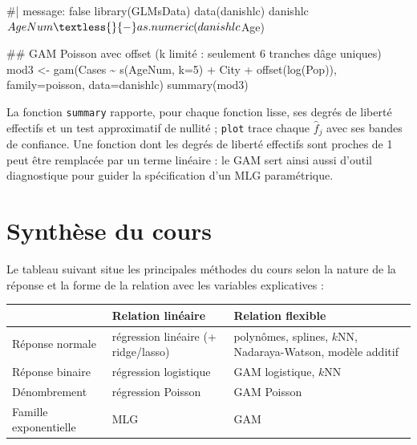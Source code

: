 \documentclass[
  french,
  letterpaper,
  DIV=11,
  numbers=noendperiod]{scrreprt}
\newenvironment{Shaded}{\begin{snugshade}}{\end{snugshade}}
\newcommand{\NormalTok}[1]{\textcolor[rgb]{0.00,0.23,0.31}{#1}}
\newcounter{none} %
\begin{document}
\begin{Shaded}
\begin{Highlighting}[]
\NormalTok{\#| message: false}
\NormalTok{library(GLMsData)}
\NormalTok{data(danishlc)}
\NormalTok{danishlc$AgeNum \textless{}{-} as.numeric(danishlc$Age)}

\NormalTok{\#\# GAM Poisson avec offset (k limité : seulement 6 tranches d\textquotesingle{}âge uniques)}
\NormalTok{mod3 \textless{}{-} gam(Cases \textasciitilde{} s(AgeNum, k=5) + City + offset(log(Pop)),}
\NormalTok{            family=poisson, data=danishlc)}
\NormalTok{summary(mod3)}
\end{Highlighting}
\end{Shaded}

La fonction \texttt{summary} rapporte, pour chaque fonction lisse, ses
degrés de liberté effectifs et un test approximatif de nullité ;
\texttt{plot} trace chaque \(\hat f_j\) avec ses bandes de confiance.
Une fonction dont les degrés de liberté effectifs sont proches de 1 peut
être remplacée par un terme linéaire : le GAM sert ainsi aussi d'outil
diagnostique pour guider la spécification d'un MLG paramétrique.

\section{Synthèse du cours}\label{synthuxe8se-du-cours}

Le tableau suivant situe les principales méthodes du cours selon la
nature de la réponse et la forme de la relation avec les variables
explicatives :

{\def\LTcaptype{none} %
\begin{longtable}[]{@{}
  >{\raggedright\arraybackslash}p{}
  >{\raggedright\arraybackslash}p{}
  >{\raggedright\arraybackslash}p{}@{}}
\toprule\noalign{}
\begin{minipage}[b]{\linewidth}\raggedright
\end{minipage} & \begin{minipage}[b]{\linewidth}\raggedright
\textbf{Relation linéaire}
\end{minipage} & \begin{minipage}[b]{\linewidth}\raggedright
\textbf{Relation flexible}
\end{minipage} \\
\midrule\noalign{}
\endhead
\bottomrule\noalign{}
\endlastfoot
Réponse normale & régression linéaire (+ ridge/lasso) & polynômes,
splines, \(k\)NN, Nadaraya-Watson, modèle additif \\
Réponse binaire & régression logistique & GAM logistique, \(k\)NN \\
Dénombrement & régression Poisson & GAM Poisson \\
Famille exponentielle & MLG & GAM \\
\end{longtable}
}
\end{document}
